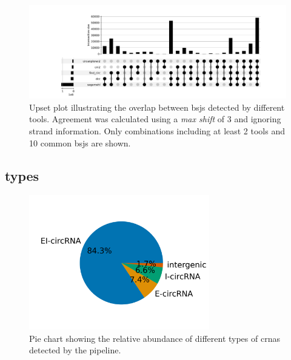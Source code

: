 \begin{figure}[H]
    \centering

    \includegraphics[width=\textwidth]{chapters/4_results_and_discussion/figures/detection/upset/shift_3_unstranded.png}
    \caption{Upset plot illustrating the overlap between \glspl{bsj} detected
        by
        different tools.
        Agreement was calculated using a \textit{max shift} of 3 and ignoring strand
        information.
        Only combinations including at least 2 tools and 10 common \glspl{bsj} are
        shown.
    }
    \label{fig:detection_upset_3_nostrand}
\end{figure}

\subsection{ types}

\begin{figure}[H]
    \centering

    \includegraphics[width=0.7\textwidth]{chapters/4_results_and_discussion/figures/detection/types.png}
    \caption{Pie chart showing the relative abundance of different types of
        \glspl{crna} detected by the pipeline.
    }
    \label{fig:circrna_types}
\end{figure}

